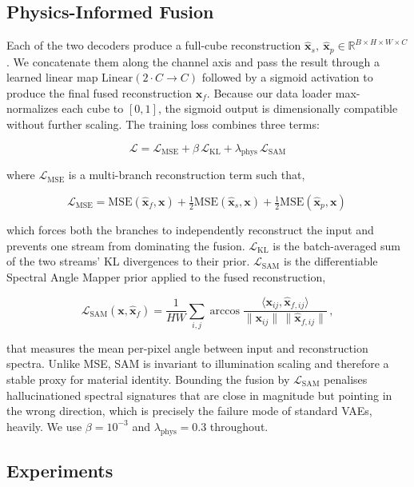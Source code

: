 \documentclass{article} %
\begin{document}
\subsection{Physics-Informed Fusion}

Each of the two decoders produce a full-cube reconstruction $\hat{\mathbf{x}}_s, \ \hat{\mathbf{x}}_p \in \mathbb{R}^{B \times H \times W \times C}$. We concatenate them along the channel axis and pass the result through a learned linear map $\mathrm{Linear}(2 \cdot C \rightarrow C)$ followed by a sigmoid activation to produce the final fused reconstruction $\hat{\mathbf{x}}_f$. Because our data loader max-normalizes each cube to $[0, 1]$, the sigmoid output is dimensionally compatible without further scaling. The training loss combines three terms:

\[
\mathcal{L} = \mathcal{L}_{\mathrm{MSE}} + \beta \, \mathcal{L}_{\mathrm{KL}} + \lambda_{\mathrm{phys}} \, \mathcal{L}_{\mathrm{SAM}}
\]

where $\mathcal{L}_{\mathrm{MSE}}$ is a multi-branch reconstruction term such that,

\[
\mathcal{L}_{\mathrm{MSE}} = \mathrm{MSE}(\hat{\mathbf{x}}_f, \mathbf{x}) + \tfrac{1}{2}\mathrm{MSE}(\hat{\mathbf{x}}_s, \mathbf{x}) + \tfrac{1}{2}\mathrm{MSE}(\hat{\mathbf{x}}_p, \mathbf{x}) \,
\]

which forces both the branches to independently reconstruct the input and prevents one stream from dominating the fusion. $\mathcal{L}_{\mathrm{KL}}$ is the batch-averaged sum of the two streams' KL divergences to their prior. $\mathcal{L}_{\mathrm{SAM}}$ is the differentiable Spectral Angle Mapper prior applied to the fused reconstruction,

\[
\mathcal{L}_{\mathrm{SAM}}(\mathbf{x}, \hat{\mathbf{x}}_f) = \frac{1}{HW}\sum_{i, j} \arccos \frac{\langle \mathbf{x}_{ij}, \hat{\mathbf{x}}_{f, ij} \rangle}{\|\mathbf{x}_{ij}\| \, \|\hat{\mathbf{x}}_{f, ij}\|} \, ,
\]

that measures the mean per-pixel angle between input and reconstruction spectra. Unlike MSE, SAM is invariant to illumination scaling and therefore a stable proxy for material identity. Bounding the fusion by $\mathcal{L}_{\mathrm{SAM}}$ penalises hallucinationed spectral signatures that are close in magnitude but pointing in the wrong direction, which is precisely the failure mode of standard VAEs, heavily. We use $\beta = 10^{-3}$ and $\lambda_{\mathrm{phys}} = 0.3$ throughout.

\subsection{Experiments}
\end{document}
